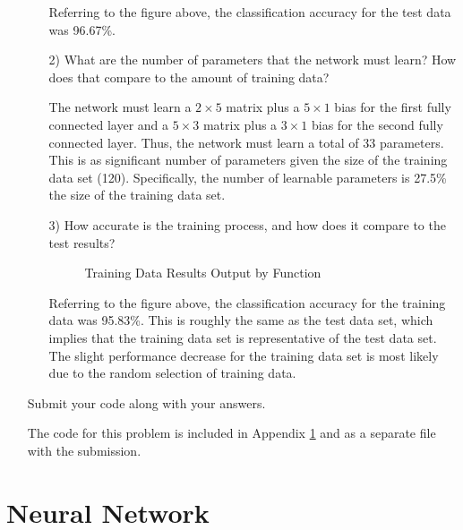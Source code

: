 \documentclass[fleqn]{article}
\begin{document}
\begin{enumerate}
\begin{enumerate}
			Referring to the figure above, the classification accuracy for the test data was 96.67\%.
			
			\item[2)] What are the number of parameters that the network must learn? How does that compare to the amount of training data?
			
			The network must learn a $2 \times 5$ matrix plus a $5 \times 1$ bias for the first fully connected layer and a $5 \times 3$ matrix plus a $3 \times 1$ bias for the second fully connected layer. Thus, the network must learn a total of 33 parameters. This is as significant number of parameters given the size of the training data set (120). Specifically, the number of learnable parameters is 27.5\% the size of the training data set. 
			
			\item[3)] How accurate is the training process, and how does it compare to the test results?
			
			\begin{figure}[H]
				\centerline{}
				\caption{Training Data Results Output by Function}
				\label{training_data_results}
			\end{figure}
		
			Referring to the figure above, the classification accuracy for the training data was 95.83\%. This is roughly the same as the test data set, which implies that the training data set is representative of the test data set. The slight performance decrease for the training data set is most likely due to the random selection of training data.
			
		\end{enumerate}
		
		Submit your code along with your answers.
		
		The code for this problem is included in Appendix \ref{neural_network} and as a separate file with the submission.
		
	\end{enumerate}
	
	\pagebreak
	\appendix
	\section{Neural Network}
	\label{neural_network}
	\lstset{style=Matlab-editor,basicstyle=\ttfamily\footnotesize}
	
	\raggedbottom
	\pagebreak
\end{document}
